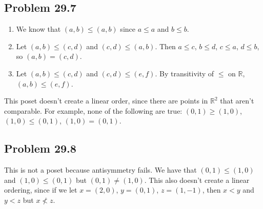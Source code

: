 \documentclass{article}
\newcommand{\R}{\mathbb{R}}
\begin{document}
\subsection*{Problem 29.7}
\begin{enumerate}
    \item We know that $(a, b) \le (a, b)$ since $a \le a$ and $b \le b$.
    \item Let $(a, b) \le (c, d)$ and $(c, d) \le (a, b)$. Then $a \le c$, $b \le d$, $c \le a$, $d \le b$, so $(a, b) = (c, d)$.
    \item Let $(a, b) \le (c, d)$ and $(c, d) \le (e, f)$. By transitivity of $\le$ on $\R$, $(a, b) \le (e, f)$.
\end{enumerate}
This poset doesn't create a linear order, since there are points in $\R^2$ that aren't comparable. For example, none of the following are true: $(0, 1) \ge (1, 0)$, $(1, 0) \le (0, 1)$, $(1, 0) = (0, 1)$.

\subsection*{Problem 29.8}
This is not a poset because antisymmetry fails. We have that $(0, 1) \le (1, 0)$ and $(1, 0) \le (0, 1)$ but $(0, 1) \neq (1, 0)$. This also doesn't create a linear ordering, since if we let $x = (2, 0)$, $y = (0, 1)$, $z = (1, -1)$, then $x < y$ and $y < z$ but $x \not< z$.
\end{document}
